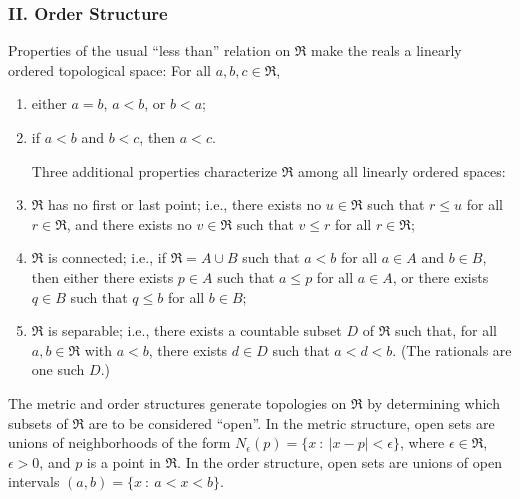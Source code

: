 \documentclass{article}
\begin{document}
\subsubsection*{II. Order Structure}

Properties of the usual ``less than'' relation on $\Re$ make the reals a linearly ordered topological space: For all $a,b,c \in \Re$,
\begin{enumerate}[\hspace{1cm}(1)]
  \item either $a = b$, $a < b$, or $b < a$; 
  \item if $a < b$ and $b < c$, then $a < c$.
    
    Three additional properties characterize $\Re$ among all linearly ordered spaces:
  \item $\Re$ has no first or last point; i.e., there exists no $u \in \Re$ such that $r \leq u$ for all $r \in \Re$, and there exists no $v \in \Re$ such that $v \leq r$ for all $r \in \Re$;
  \item $\Re$ is connected; i.e., if $\Re = A \cup B$ such that $a < b$ for all $a \in A$ and $b \in B$, then either there exists $p \in A$ such that $a \leq p$ for all $a \in A$, or there exists $q \in B$ such that $q \leqslant b$ for all $b \in B$;
  \item $\Re$ is separable; i.e., there exists a countable subset $D$ of $\Re$ such that, for all $a,b \in \Re$ with $a < b$, there exists $d \in D$ such that $a < d < b$. (The rationals are one such $D$.)
\end{enumerate}

The metric and order structures generate topologies on $\Re$ by determining which subsets of $\Re$ are to be considered ``open''. In the metric structure, open sets are unions of neighborhoods of the form $N_\epsilon (p) = \{ x\ :\ |x-p| < \epsilon \}$, where $\epsilon \in \Re$, $\epsilon > 0$, and $p$ is a point in $\Re$. In the order structure, open sets are unions of open intervals $(a,b) = \{ x\ :\ a < x < b \}$.
\end{document}
